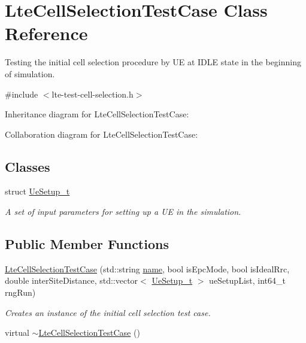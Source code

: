 \hypertarget{classLteCellSelectionTestCase}{}\section{Lte\+Cell\+Selection\+Test\+Case Class Reference}
\label{classLteCellSelectionTestCase}


Testing the initial cell selection procedure by UE at I\+D\+LE state in the beginning of simulation.  




{\ttfamily \#include $<$lte-\/test-\/cell-\/selection.\+h$>$}



Inheritance diagram for Lte\+Cell\+Selection\+Test\+Case\+:


Collaboration diagram for Lte\+Cell\+Selection\+Test\+Case\+:
\subsection*{Classes}
\begin{DoxyCompactItemize}
\item 
struct \hyperlink{structLteCellSelectionTestCase_1_1UeSetup__t}{Ue\+Setup\+\_\+t}
\begin{DoxyCompactList}\small\item\em A set of input parameters for setting up a UE in the simulation. \end{DoxyCompactList}\end{DoxyCompactItemize}
\subsection*{Public Member Functions}
\begin{DoxyCompactItemize}
\item 
\hyperlink{classLteCellSelectionTestCase_a28c8547fb613f89c8d99fc6df6526adb}{Lte\+Cell\+Selection\+Test\+Case} (std\+::string \hyperlink{generate__test__data__lte__spectrum__model_8m_ab74e6bf80237ddc4109968cedc58c151}{name}, bool is\+Epc\+Mode, bool is\+Ideal\+Rrc, double inter\+Site\+Distance, std\+::vector$<$ \hyperlink{structLteCellSelectionTestCase_1_1UeSetup__t}{Ue\+Setup\+\_\+t} $>$ ue\+Setup\+List, int64\+\_\+t rng\+Run)
\begin{DoxyCompactList}\small\item\em Creates an instance of the initial cell selection test case. \end{DoxyCompactList}\item 
virtual \hyperlink{classLteCellSelectionTestCase_a5592dc706a6496ae833336301c8e3705}{$\sim$\+Lte\+Cell\+Selection\+Test\+Case} ()
\end{DoxyCompactItemize}
